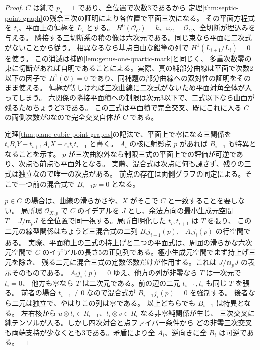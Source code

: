 \begin{proof}
$C$ は純で $p_a=1$ であり、全位置で次数3であるから
定理\ref{thm:septic-point-graph}の残余三次の証明により各位置で平面三次になる。
その平面方程式を $t_i$、平面上の偏極を $L_i$ とする。
$H^0(\mathcal O_C)=k$、$\omega_C=\mathcal O_C$、全切断が埋込みを与える。
隣接する三切断系の積の像は六次元である。同じ束なら平面に二次式がないことから従う。
相異なるなら基点自由な鉛筆の列で $H^1(L_{i+1}/L_i)=0$ を使う。
この消滅は補題\ref{lem:genus-one-quartic-mark}と同じく、
多重次数零の束に切断があれば自明であることによる。実際、真の純部分曲線は平面で次数2以下の因子で
$H^1(\mathcal O)=0$ であり、同補題の部分曲線への双対性の証明をそのまま使える。
偏極が等しければ三次曲線に二次式がないため平面対角全体が入ってしまう。
六関係の隣接平面積への制限は次元3以下で、二式以下なら曲面が残るためちょうど3である。
この三式は平面積で完全交叉、既にこれに入る $C$ の両側次数が3なので完全交叉自体が $C$ である。

定理\ref{thm:plane-cubic-point-graphs}の記法で、平面上で零になる三関係を
$t_i B_i Y-t_{i+1} A_i X+c_i t_it_{i+1}$ と書く。
$A_i$ の核に射影点 $p$ があれば $B_{i-1}$ も特異となることを示す。
$p$ が三次曲線外なら制限三式の平面上での評価が可逆であり、次点も前点も平面外となる。
実際、混合式は次点に何も課さず、残りの三式は独立なので唯一の次点がある。
前点の存在は両側グラフの同定による。そこで一つ前の混合式で $B_{i-1}p=0$ となる。

$p\in C$ の場合は、曲線の滑らかさや、$X$ がそこで $C$ と一致することを要しない。
局所環 $\mathcal O_{X,p}$ で $C$ のイデアルを $J$ とし、余法方向の最小生成元空間
$T=J/\mathfrak m_pJ$ を全位置で同一視する。局所自明化した $t_i,t_{i+1}$ は $T$ を張り、
この二元の線型関係はちょうど三混合式の二列 $B_i j_{i+1}(p),-A_i j_i(p)$ の行空間である。
実際、平面積上の三式の持上げと二つの平面式は、周囲の滑らかな六次元空間で
$C$ のイデアルの長さ5の正則列である。極小生成元空間でまず持上げ三元を除き、
残る二元に混合三式の定数係数だけが作用する。これは $J/\mathfrak m_pJ$ の表示そのものである。
$A_i j_i(p)=0$ ゆえ、他方の列が非零なら $T$ は一次元で $t_i=0$、
他方も零なら $T$ は二次元である。前の辺の二元 $t_{i-1},t_i$ も同じ $T$ を張る。
前者の場合 $t_{i-1}\ne0$ なので混合式が $B_{i-1}j_i(p)=0$ を強制する。
後者なら二元は独立で、やはりこの列は零である。
以上どちらでも $B_{i-1}$ は特異となる。
左右核から $u\otimes t_i\in R_{i-1}$、$t_i\otimes v\in R_i$ なる非零純関係が生じ、
三次交叉に純テンソルが入る。しかし四次対合と点ファイバー条件から
どの非零三次交叉も両端支持が少なくとも3である。矛盾により全 $A_i$、逆向きに全 $B_i$ は可逆である。


\end{proof}
